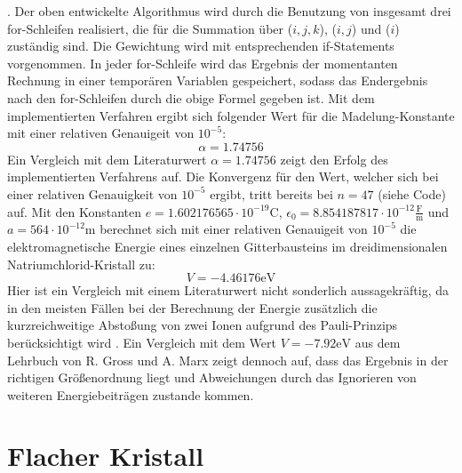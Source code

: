 \documentclass[11pt,a4paper]{article}
\begin{document}
. Der oben entwickelte Algorithmus wird durch die Benutzung von insgesamt drei for-Schleifen realisiert, die für die Summation über ($i,j,k$), ($i,j$) und ($i$) zuständig sind. Die Gewichtung wird mit entsprechenden if-Statements vorgenommen. In jeder for-Schleife wird das Ergebnis der momentanten Rechnung in einer temporären Variablen gespeichert,
sodass das Endergebnis nach den for-Schleifen durch die obige Formel gegeben ist. Mit dem implementierten Verfahren ergibt sich folgender Wert für die Madelung-Konstante mit einer relativen Genauigeit von $10^{-5}$:
\begin{equation*}
    \alpha = 1.74756
\end{equation*} Ein Vergleich mit dem Literaturwert $\alpha = 1.74756$ \cite{key4} zeigt den Erfolg des implementierten Verfahrens auf. Die Konvergenz für den Wert, welcher sich bei einer relativen Genauigkeit von $10^{-5}$ ergibt, tritt bereits bei $n=47$ (siehe Code) auf.
Mit den Konstanten \cite{key4} $e = 1.602176565 \cdot 10^{-19} \si{\coulomb}$, $\epsilon_0 = 8.854187817 \cdot 10^{-12}\frac{\si{\farad}}{\si{\metre}}$ und $a = 564 \cdot 10^{-12} \si{\metre}$ berechnet sich mit einer relativen Genauigeit von $10^{-5}$ die elektromagnetische Energie eines einzelnen Gitterbausteins im dreidimensionalen Natriumchlorid-Kristall zu:
\begin{equation*}
    V = -4.46176 \si{\electronvolt}
\end{equation*} Hier ist ein Vergleich mit einem Literaturwert nicht sonderlich aussagekräftig, da in den meisten Fällen bei der Berechnung der Energie zusätzlich die kurzreichweitige Abstoßung von zwei Ionen aufgrund des Pauli-Prinzips berücksichtigt wird \cite{key4}. Ein Vergleich mit dem Wert $V = -7.92 \si{\electronvolt}$
aus dem Lehrbuch von R. Gross und A. Marx zeigt dennoch auf, dass das Ergebnis in der richtigen Größenordnung liegt und Abweichungen durch das Ignorieren von weiteren Energiebeiträgen zustande kommen.


\section*{Flacher Kristall}\label{sec:flach}
\end{document}

